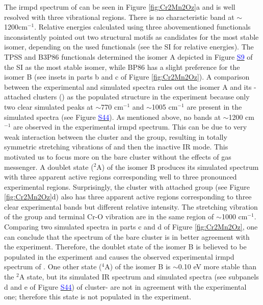 \begin{refsection}
The \acrshort{irmpd} spectrum of  can be seen in Figure \ref{fig:Cr2Mn2Oz}a and is well resolved with three vibrational regions. There is no characteristic band at $\sim$1200cm$^{-1}$. Relative energies calculated using three abovementioned functionals inconsistently pointed out two structural motifs as candidates for the most stable isomer, depending on the used functionals (see the SI for relative energies). The TPSS and B3P86 functionals determined the isomer A depicted in Figure \href{https://github.com/phamlenhan/PhDDissertation/blob/master/Chapter-8SI-Nhan-thesis-CrMnO.pdf}{\textcolor{blue}{S9}}\commenttext{\ref{SI:figs:Cr2Mn2O7}} of the SI as the most stable isomer, while BP86  has a slight preference for the isomer B (see insets in parts b and c of Figure \ref{fig:Cr2Mn2Oz}). A comparison between the experimental and simulated spectra rules out the isomer A and its -attached clusters () as the populated structure in the experiment because only two clear simulated peaks at $\sim$770 cm$^{-1}$ and $\sim$1005 cm$^{-1}$ are present in the simulated spectra (see Figure \href{https://github.com/phamlenhan/PhDDissertation/blob/master/Chapter-8SI-Nhan-thesis-CrMnO.pdf}{\textcolor{blue}{S44}}\commenttext{\ref{SI:figs:Cr2Mn2O7-spec-si}}). As mentioned above, no bands at $\sim$1200 cm$^{-1}$ are observed in the experimental \acrshort{irmpd} spectrum. This can be due to very weak interaction between the cluster  and the  group, resulting in totally symmetric stretching vibrations of  and then the inactive IR mode. This motivated us to focus more on the bare cluster  without the effects of gas messenger. A doublet state ($^2$A) of the isomer B produces its simulated spectrum with three apparent active regions corresponding well to three pronounced experimental regions. Surprisingly, the cluster with attached  group (see Figure \ref{fig:Cr2Mn2Oz}d) also has three apparent active regions corresponding to three clear experimental bands but different relative intensity. The stretching vibration of the  group and terminal Cr-O vibration are in the same region of $\sim$1000 cm$^{-1}$. Comparing two simulated spectra in parts c and d of Figure \ref{fig:Cr2Mn2Oz}, one can conclude that the spectrum of the bare cluster is in better agreement with the experiment. Therefore, the doublet state of the isomer B is believed to be populated in the experiment and causes the observed experimental \acrshort{irmpd} spectrum of . One other state ($^4$A) of the isomer B is $\sim$0.10 eV more stable than the $^2$A state, but its simulated IR spectrum and simulated spectra (see subpanels d and e of Figure \href{https://github.com/phamlenhan/PhDDissertation/blob/master/Chapter-8SI-Nhan-thesis-CrMnO.pdf}{\textcolor{blue}{S44}}\commenttext{\ref{SI:figs:Cr2Mn2O7-spec-si}}) of cluster- are not in agreement with the experimental one; therefore this state is not populated in the experiment.  



\end{refsection}
